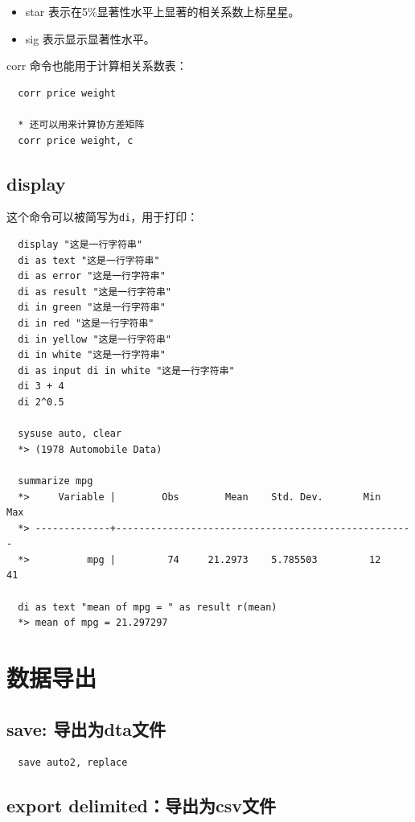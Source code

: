\documentclass[cn,fancy,blue,11pt]{elegantbook}
\begin{document}
\begin{itemize}
  \item  star 表示在5\%显著性水平上显著的相关系数上标星星。
  \item  sig 表示显示显著性水平。
\end{itemize}

corr 命令也能用于计算相关系数表：

\begin{lstlisting}
  corr price weight

  * 还可以用来计算协方差矩阵
  corr price weight, c
\end{lstlisting}

\subsection{display}

这个命令可以被简写为\texttt{di}，用于打印：

\begin{lstlisting}
  display "这是一行字符串"
  di as text "这是一行字符串"
  di as error "这是一行字符串"
  di as result "这是一行字符串"
  di in green "这是一行字符串"
  di in red "这是一行字符串"
  di in yellow "这是一行字符串"
  di in white "这是一行字符串"
  di as input di in white "这是一行字符串"
  di 3 + 4
  di 2^0.5

  sysuse auto, clear
  *> (1978 Automobile Data)

  summarize mpg
  *>     Variable |        Obs        Mean    Std. Dev.       Min        Max
  *> -------------+----------------------------------------------------
  *>          mpg |         74     21.2973    5.785503         12         41

  di as text "mean of mpg = " as result r(mean)
  *> mean of mpg = 21.297297
\end{lstlisting}

\section{数据导出}
\subsection{save: 导出为dta文件}

\begin{lstlisting}
  save auto2, replace
\end{lstlisting}

\subsection{export delimited：导出为csv文件}
\end{document}
